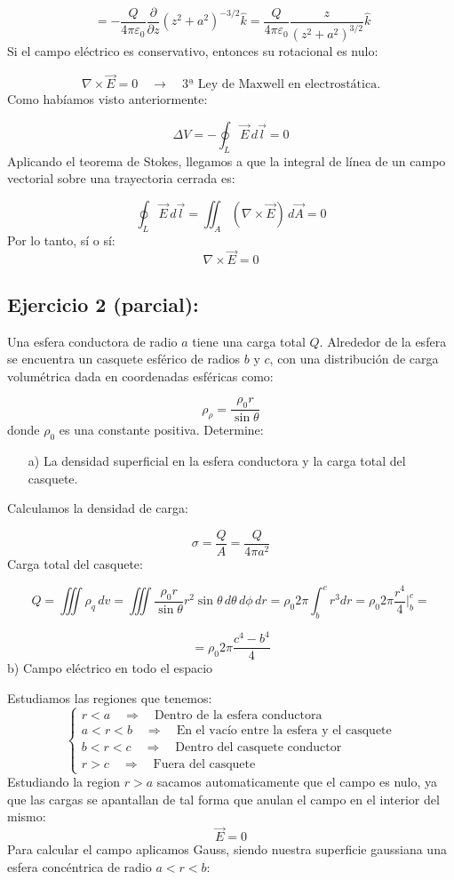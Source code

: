 \documentclass[a4paper,12pt]{article}
\begin{document}
\[
\ = - \frac{Q}{4\pi \varepsilon_0} \frac{\partial}{\partial z} (z^2 + a^2)^{-3/2} \hat{k} = \frac{Q}{4\pi \varepsilon_0} \frac{z}{(z^2 + a^2)^{3/2}} \hat{k}
\]
\newpage
\noindent
Si el campo eléctrico es conservativo, entonces su rotacional es nulo:

\[
\nabla \times \vec{E} = 0
\quad \rightarrow \quad
\text{3ª Ley de Maxwell en electrostática.}
\]
Como habíamos visto anteriormente:

\[
\Delta V = - \oint_{L} \vec{E}\, d\vec{l} = 0
\]
Aplicando el teorema de Stokes, llegamos a que la integral de línea de un campo vectorial sobre una trayectoria cerrada es:

\[
\oint_{L} \vec{E}\, d\vec{l} = \iint_{A} (\nabla \times \vec{E})\, d\vec{A} = 0
\]
Por lo tanto, sí o sí:
\[
\nabla \times \vec{E} = 0
\]

\subsection*{Ejercicio 2 (parcial):} 
\noindent
Una esfera conductora de radio $a$ tiene una carga total $Q$.  
Alrededor de la esfera se encuentra un casquete esférico de radios $b$ y $c$, con una distribución de carga volumétrica dada en coordenadas esféricas como:

\[
\rho_\rho = \frac{\rho_0 r}{\sin\theta}
\]
donde $\rho_0$ es una constante positiva. Determine:

\begin{enumerate}
    \item[a)] La densidad superficial en la esfera conductora y la carga total del casquete.
\end{enumerate}
\noindent
Calculamos la densidad de carga:

\[
\sigma = \frac{Q}{A} = \frac{Q}{4\pi a^2}
\]
Carga total del casquete:

\[
Q = \iiint \rho_q\, dv = \iiint \frac{\rho_0 r}{\sin\theta} r^2 \sin\theta\, d\theta\, d\phi\, dr 
= \rho_0 2\pi \int_{b}^{c} r^3 dr = \rho_0 2\pi \frac{r^4}{4} \Big|_{b}^{c} =
\]

\[
 = \rho_0 2\pi \frac{c^4 - b^4}{4}
\]
\newpage
\noindent
b) Campo eléctrico en todo el espacio

\medskip
\noindent
Estudiamos las regiones que tenemos:
\[
\begin{cases}
r < a \quad \Rightarrow \quad \text{Dentro de la esfera conductora} \\[10pt]
a < r < b \quad \Rightarrow \quad \text{En el vacío entre la esfera y el casquete} \\[10pt]
b < r < c \quad \Rightarrow \quad \text{Dentro del casquete conductor} \\[10pt]
r > c \quad \Rightarrow \quad \text{Fuera del casquete}
\end{cases}
\]
\noindent
Estudiando la region $r > a$ sacamos automaticamente que el campo es nulo, ya que las cargas se apantallan de tal forma que anulan el campo en el interior del mismo:
\[
\vec{E} = 0
\]
Para calcular el campo aplicamos Gauss, siendo nuestra superficie gaussiana una esfera concéntrica de radio $a < r < b$:
\end{document}
